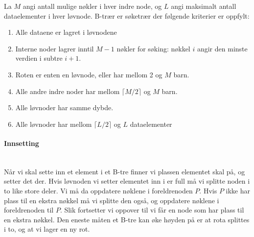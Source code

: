 \begin{definition} La $ M $ angi antall mulige nøkler i hver indre node, og $ L $ angi maksimalt antall dataelementer i hver løvnode. B-trær er søketrær der følgende kriterier er oppfylt:
\begin{enumerate}[i]
\item Alle dataene er lagret i løvnodene
\item Interne noder lagrer inntil $ M-1 $ nøkler for søking: nøkkel $ i $ angir den minste verdien i subtre $ i+1 $.
\item Roten er enten en løvnode, eller har mellom 2 og $ M $ barn. 
\item Alle andre indre noder har mellom $ \lceil M/2\rceil $ og $ M $ barn. 
\item Alle løvnoder har samme dybde.
\item Alle løvnoder har mellom $ \lceil L/2\rceil $ og $ L $ dataelementer
\end{enumerate}
\label{def:b_tre}
\end{definition}


\paragraph{Innsetting}~\\
Når vi skal sette inn et element i et B-tre finner vi plassen elementet skal på, og setter det der. Hvis løvnoden vi setter elementet inn i er full må vi splitte noden i to like store deler. Vi må da oppdatere nøklene i foreldrenoden $ P $. Hvis $ P $ ikke har plass til en ekstra nøkkel må vi splitte den også, og oppdatere nøklene i foreldrenoden til $ P $. Slik fortsetter vi oppover til vi får en node som har plass til en ekstra nøkkel. Den eneste måten et B-tre kan øke høyden på er at rota splittes i to, og at vi lager en ny rot. 

